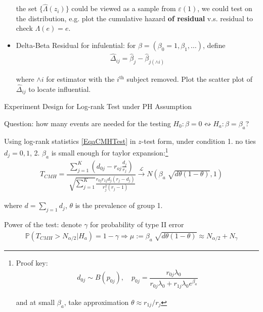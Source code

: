 \begin{itemize}[topsep=2pt,itemsep=0pt]
    the set $ \{\hat{\Lambda }(z_i)\} $ could be viewed as a sample from $ \varepsilon (1) $, we could test on the distribution, e.g. plot the cumulative hazard \textbf{of residual} v.s. residual to check $ \Lambda (e)=e $.
    
    \item Delta-Beta Residual for infulential:  for $ \beta =(\beta _0=1,\beta _1,\ldots) $, define
    \begin{align}
        \hat{\Delta }_{ij}=\hat{\beta }_j-\hat{\beta }_{j(\wedge i)} 
    \end{align}

    where $ \wedge i $ for estimator with the $ i^\mathrm{th}  $ subject removed. Plot the scatter plot of $ \hat{\Delta }_{ij} $ to locate influential.

\end{itemize}

\begin{point}
    Experiment Design for Log-rank Test under PH Assumption
\end{point}

    Question: how many events are needed for the testing $ H_0:\beta =0\leftrightsquigarrow H_a:\beta =\beta _a $?

    Using log-rank statistics \autoref{EqaCMHTest} in $ z $-test form, under condition 1. no ties $ d_j=0,1 $, 2. $ \beta _a $ is small enough for taylor expansion:\footnote{Proof key: 
    \begin{align}
        d_{0j}\sim B(p_{0j}), \quad  p_{0j}=\dfrac{r_{0j}\lambda _0}{r_{0j}\lambda _0+r_{1j}\lambda _0e^{\beta _a} }
    \end{align}
    
    and at small $ \beta _a $, take approximation $ \theta \approx r_{1j}/r_{j} $
    }
    \begin{align}
        T_{CMH}= \dfrac{\sum_{j=1}^K\left( d_{0j}-r_{oj}\frac{d_j}{r_j} \right)}{\sqrt[]{\sum_{j=1}^K}\frac{r_{0j}r_{1j}d_j(r_j-d_j)}{r_j^2(r_j-1)}}\xrightarrow[]{\mathscr{L}} N(\beta _a\sqrt[]{d\theta (1-\theta )}, 1)
    \end{align}

    where $ d=\sum_{j=1}d_j $, $ \theta  $ is the prevalence of group 1.

    Power of the test: denote $ \gamma  $ for probability of type II error
    \begin{align}
        \mathbb{P}\left( T_{CMH}>N_{\alpha /2}|H_a \right) = 1-\gamma \Rightarrow \mu :=\beta _a\sqrt[]{d\theta (1-\theta )}\approx N_{\alpha /2}+N_\gamma 
    \end{align}

